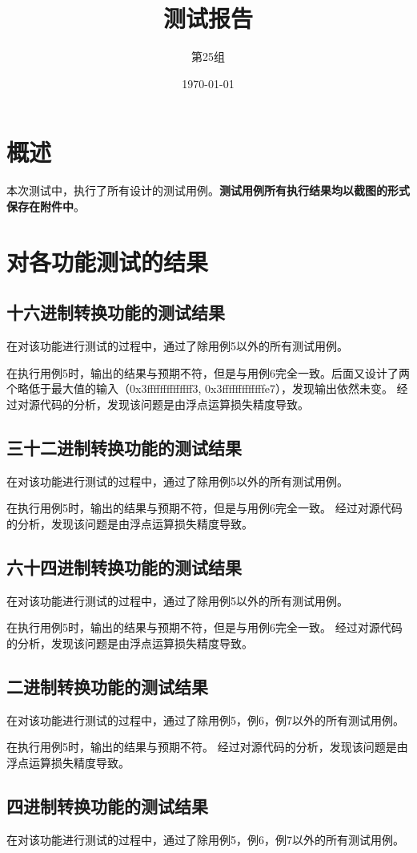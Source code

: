 \documentclass[12pt, a4paper, oneside]{ctexart}
\title{\textbf{测试报告}}
\author{第25组}
\date{\today}
\begin{document}
\maketitle

\section{概述}
本次测试中，执行了所有设计的测试用例。\textbf{测试用例所有执行结果均以截图的形式保存在附件中}。

\section{对各功能测试的结果}
\subsection{十六进制转换功能的测试结果}
在对该功能进行测试的过程中，通过了除用例5以外的所有测试用例。

在执行用例5时，输出的结果与预期不符，但是与用例6完全一致。后面又设计了两个略低于最大值的输入（0x3ffffffffffffff3, 0x3fffffffffffffe7），发现输出依然未变。
经过对源代码的分析，发现该问题是由浮点运算损失精度导致。
\subsection{三十二进制转换功能的测试结果}
在对该功能进行测试的过程中，通过了除用例5以外的所有测试用例。

在执行用例5时，输出的结果与预期不符，但是与用例6完全一致。
经过对源代码的分析，发现该问题是由浮点运算损失精度导致。
\subsection{六十四进制转换功能的测试结果}
在对该功能进行测试的过程中，通过了除用例5以外的所有测试用例。

在执行用例5时，输出的结果与预期不符，但是与用例6完全一致。
经过对源代码的分析，发现该问题是由浮点运算损失精度导致。

\subsection{二进制转换功能的测试结果}
在对该功能进行测试的过程中，通过了除用例5，例6，例7以外的所有测试用例。

在执行用例5时，输出的结果与预期不符。
经过对源代码的分析，发现该问题是由浮点运算损失精度导致。

\subsection{四进制转换功能的测试结果}
在对该功能进行测试的过程中，通过了除用例5，例6，例7以外的所有测试用例。
\end{document}
